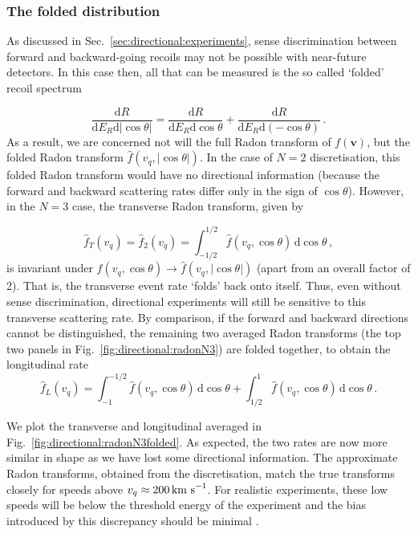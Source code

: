 \subsubsection{The folded distribution}

As discussed in Sec.~\ref{sec:directional:experiments}, sense discrimination between forward and backward-going recoils may not be possible with near-future detectors. In this case then, all that can be measured is the so called `folded' recoil spectrum

\begin{equation}
\frac{\mathrm{d}R}{\mathrm{d}E_R\mathrm{d}|\cos\theta|} = \frac{\mathrm{d}R}{\mathrm{d}E_R\mathrm{d}\cos\theta} + \frac{\mathrm{d}R}{\mathrm{d}E_R\mathrm{d}(-\cos\theta)}\,.
\end{equation}
As a result, we are concerned not will the full Radon transform of $f(\textbf{v})$, but the folded Radon transform $\hat{f}(v_q, |\cos\theta|)$. In the case of $N=2$ discretisation, this folded Radon transform would have no directional information (because the forward and backward scattering rates differ only in the sign of $\cos\theta$). However, in the $N=3$ case, the transverse Radon transform, given by 

\begin{equation}
\hat{f}_T(v_q) = \hat{f}_2(v_q) = \int_{-1/2}^{1/2} \hat{f}(v_q, \cos\theta) \,\mathrm{d}\cos\theta\,,
\end{equation}
is invariant under $\hat{f}(v_q, \cos\theta) \rightarrow \hat{f}(v_q, |\cos\theta|)$ (apart from an overall factor of 2). That is, the transverse event rate `folds' back onto itself. Thus, even without sense discrimination, directional experiments will still be sensitive to this transverse scattering rate. By comparison, if the forward and backward directions cannot be distinguished, the remaining two averaged Radon transforms (the top two panels in Fig.~\ref{fig:directional:radonN3}) are folded together, to obtain the longitudinal rate
\begin{equation}
\hat{f}_L(v_q) = \int_{-1}^{-1/2} \hat{f}(v_q, \cos\theta) \,\mathrm{d}\cos\theta + \int_{1/2}^{1} \hat{f}(v_q, \cos\theta) \,\mathrm{d}\cos\theta\,.
\end{equation}

We plot the transverse and longitudinal averaged in Fig.~\ref{fig:directional:radonN3folded}.  As expected, the two rates are now more similar in shape as we have lost some directional information. The approximate Radon transforms, obtained from the discretisation, match the true transforms closely for speeds above $v_q\approx 200 \,\textrm{km s}^{-1}$.  For realistic experiments, these low speeds will be below the threshold energy of the experiment and the bias introduced by this discrepancy should be minimal . 

